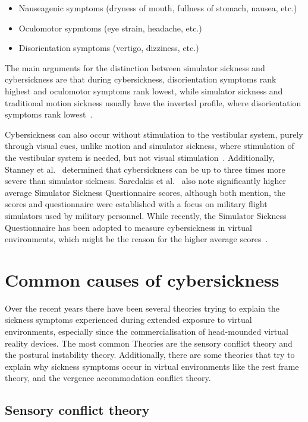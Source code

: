 \begin{itemize}
    \item Nauseagenic symptoms (dryness of mouth, fullness of stomach, nausea, etc.)
    \item Oculomotor sypmtoms (eye strain, headache, etc.)
    \item Disorientation symptoms (vertigo, dizziness, etc.)
\end{itemize}
The main arguments for the distinction between simulator sickness and cybersickness are that during cybersickness,
disorientation symptoms rank highest and oculomotor symptoms rank lowest, while simulator sickness and traditional
motion sickness usually have the inverted profile, where disorientation symptoms rank lowest~\cite{Stanney1997}.

Cybersickness can also occur without stimulation to the vestibular system, purely through visual cues, unlike motion
and simulator sickness, where stimulation of the vestibular system is needed, but not visual stimulation~\cite{LaViola2000}.
Additionally, Stanney et al.~\cite{Stanney1997} determined that cybersickness can be up to three times more severe
than simulator sickness.
Saredakis et al.~\cite{Saredakis2020} also note significantly higher average Simulator Sickness Questionnaire scores,
although both mention, the scores and questionnaire were established with a focus on military flight simulators used
by military personnel.
While recently, the Simulator Sickness Questionnaire has been adopted to measure cybersickness in virtual
environments, which might be the reason for the higher average scores~\cite{Saredakis2020}.


\section{Common causes of cybersickness}\label{sec:common-causes-of-cybersickness}

Over the recent years there have been several theories trying to explain the sickness symptoms experienced during
extended exposure to virtual environments, especially since the commercialisation of head-mounded virtual reality
devices.
The most common Theories are the sensory conflict theory and the postural instability theory.
Additionally, there are some theories that try to explain why sickness symptoms occur in virtual environments like the
rest frame theory, and the vergence accommodation conflict theory.


\subsection{Sensory conflict theory}\label{subsec:sensory-conflict-theory}

